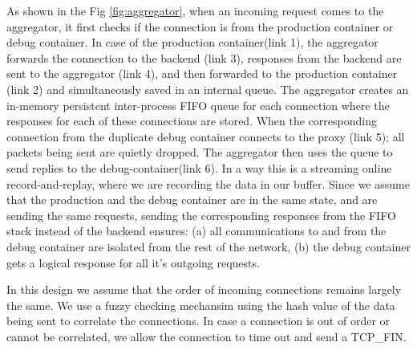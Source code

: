 \noindent
As shown in the Fig \ref{fig:aggregator}, when an incoming request comes to the aggregator, it first checks if the connection is from the production container or debug container. 
In case of the production container(link 1), the aggregator forwards the connection to the backend (link 3), responses from the backend are sent to the aggregator (link 4), and then forwarded to the production container (link 2) and simultaneously saved in an internal queue.
The aggregator creates an in-memory persistent inter-process FIFO queue for each connection where the responses for each of these connections are stored.
When the corresponding connection from the duplicate debug container connects to the proxy (link 5); all packets being sent are quietly dropped. 
The aggregator then uses the queue to send replies to the debug-container(link 6).
In a way this is a streaming online record-and-replay, where we are recording the data in our buffer.
Since we assume that the production and the debug container are in the same state, and are sending the same requests, sending the corresponding responses from the FIFO stack instead of the backend ensures: (a) all communications to and from the debug container are isolated from the rest of the network, (b) the debug container gets a logical response for all it's outgoing requests.

\noindent
In this design we assume that the order of incoming connections remains largely the same.
We use a fuzzy checking mechansim using the hash value of the data being sent to correlate the connections. 
In case a connection is out of order or cannot be correlated, we allow the connection to time out and send a TCP\_FIN.

